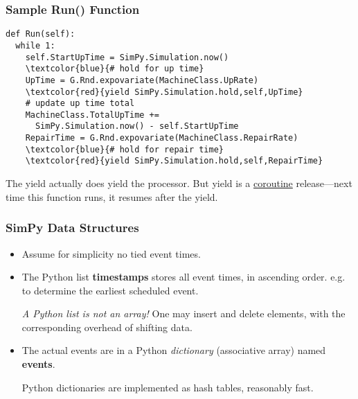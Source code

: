 \documentclass{beamer}
\begin{document}
\begin{frame}[fragile]
\frametitle{Sample Run() Function}

\begin{Verbatim}[commandchars=\\\{\}]
def Run(self):
  while 1:
    self.StartUpTime = SimPy.Simulation.now()
    \textcolor{blue}{# hold for up time}
    UpTime = G.Rnd.expovariate(MachineClass.UpRate)
    \textcolor{red}{yield SimPy.Simulation.hold,self,UpTime}
    # update up time total
    MachineClass.TotalUpTime += 
      SimPy.Simulation.now() - self.StartUpTime
    RepairTime = G.Rnd.expovariate(MachineClass.RepairRate)
    \textcolor{blue}{# hold for repair time}
    \textcolor{red}{yield SimPy.Simulation.hold,self,RepairTime}
\end{Verbatim}

\pause 

The {\color{red} yield} actually does yield the processor.  \pause But
{\color{red} yield} is a \underline{coroutine} release---next time this
function runs, it resumes after the {\color{red} yield}.

\end{frame}

\begin{frame}[fragile]
\frametitle{SimPy Data Structures}

\begin{itemize}

\item Assume  for simplicity no tied event times.

\pause

\item The Python list {\bf timestamps} stores all event times, in
ascending order.  e.g. to determine the earliest scheduled event.

\pause

{\it A Python list is not an array!}  One may insert and delete elements, with
the corresponding overhead of shifting data.

\pause

\item The actual events are in a Python {\it dictionary} (associative
array) named {\bf events}.  

Python dictionaries are implemented as hash tables, reasonably fast.

\end{itemize}

\end{frame}
\end{document}
